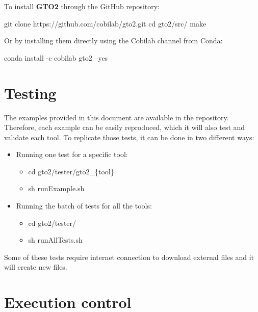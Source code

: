 \documentclass[11pt,]{krantz}
\makeatletter
\newenvironment{Shaded}{\begin{snugshade}}{\end{snugshade}}
\newcommand{\FunctionTok}[1]{\textcolor[rgb]{0,0,0}{#1}}
\newcommand{\BuiltInTok}[1]{#1}
\newcommand{\ExtensionTok}[1]{#1}
\newcommand{\NormalTok}[1]{#1}
\providecommand{\tightlist}{%
  \setlength{\itemsep}{0pt}\setlength{\parskip}{0pt}}
\newenvironment{kframe}{%
\medskip{}
\setlength{\fboxsep}{.8em}
 \def\at@end@of@kframe{}%
 \ifinner\ifhmode%
  \def\at@end@of@kframe{\end{minipage}}%
  \begin{minipage}{\columnwidth}%
 \fi\fi%
 \def\FrameCommand##1{\hskip\@totalleftmargin \hskip-\fboxsep
 \colorbox{shadecolor}{##1}\hskip-\fboxsep
     \hskip-\linewidth \hskip-\@totalleftmargin \hskip\columnwidth}%
 \MakeFramed {\advance\hsize-\width
   \@totalleftmargin\z@ \linewidth\hsize
   \@setminipage}}%
 {\par\unskip\endMakeFramed%
 \at@end@of@kframe}
\renewenvironment{Shaded}{\begin{kframe}}{\end{kframe}}
\makeatother
\begin{document}
To install \textbf{GTO2} through the GitHub repository:

\begin{Shaded}
\begin{Highlighting}[]
\FunctionTok{git}\NormalTok{ clone https://github.com/cobilab/gto2.git}
\BuiltInTok{cd}\NormalTok{ gto2/src/}
\FunctionTok{make}
\end{Highlighting}
\end{Shaded}

Or by installing them directly using the Cobilab channel from Conda:

\begin{Shaded}
\begin{Highlighting}[]
\ExtensionTok{conda}\NormalTok{ install -c cobilab gto2 --yes}
\end{Highlighting}
\end{Shaded}

\section{Testing}\label{testing}

The examples provided in this document are available in the repository. Therefore, each example can be easily reproduced, which it will also test and validate each tool. To replicate those tests, it can be done in two different ways:

\begin{itemize}
\tightlist
\item
  Running one test for a specific tool:

  \begin{itemize}
  \tightlist
  \item
    cd gto2/tester/gto2\_\{tool\}
  \item
    sh runExample.sh
  \end{itemize}
\item
  Running the batch of tests for all the tools:

  \begin{itemize}
  \tightlist
  \item
    cd gto2/tester/
  \item
    sh runAllTests.sh
  \end{itemize}
\end{itemize}

Some of these tests require internet connection to download external files and it will create new files.

\section{Execution control}\label{execution-control}
\end{document}
